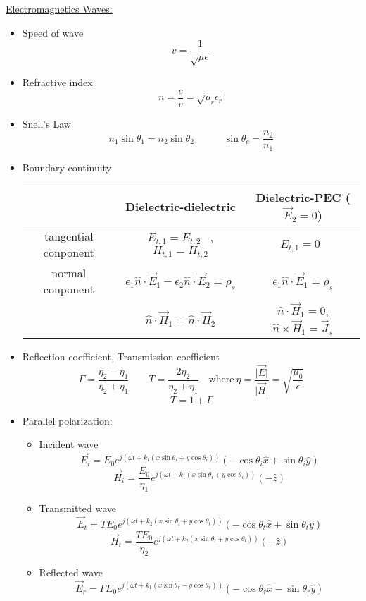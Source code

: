 \documentclass{article}
\begin{document}
\underline{Electromagnetics Waves:}
\begin{itemize}
	\item Speed of wave \[v=\frac{1}{\sqrt{\mu\epsilon}}\]
	\item Refractive index \[n=\frac{c}{v}=\sqrt{\mu_{r}\epsilon_{r}}\]
	\item Snell's Law \[n_{1}\sin\theta_{1} =n_{2}\sin\theta_{2} \quad \quad \quad \sin\theta_{c}=\frac{n_{2}}{n_{1}}\]
	\item Boundary continuity 
		\begin{table}[H] \centering
		\begin{tabular}{|c|c|c|}
		\hline
		& Dielectric-dielectric & Dielectric-PEC ($\vec{E}_{2}=0$)\\ \hline
		tangential conponent & $E_{t,1}=E_{t,2}$ \ ,  $H_{t,1}=H_{t,2}$ & $E_{t,1}=0$\  \\ \hline
		normal conponent & $\epsilon_{1}\hat{n}\cdot\vec{E}_{1}-\epsilon_{2}\hat{n}\cdot\vec{E}_{2}=\rho_{s}$  & $\epsilon_{1} \hat{n}\cdot\vec{E}_{1}=\rho_{s}$  \\ 
		& $\hat{n}\cdot\vec{H}_{1}=\hat{n}\cdot\vec{H}_{2}$ & $\hat{n}\cdot\vec{H}_{1}=0$, \quad  $\hat{n}\times \vec{H}_{1}=\vec{J}_{s}$ \\ \hline
		\end{tabular}
		\end{table}
	\item Reflection coefficient, Transmission coefficient \[\Gamma=\frac{\eta_{2}-\eta_{1}}{\eta_{2}+\eta_{1}} \quad \quad T=\frac{2\eta_{2}}{\eta_{2}+\eta_{1}} \quad \text{where} \ \eta=\frac{\lvert \vec{E} \rvert}{\lvert \vec{H} \rvert}=\sqrt{\frac{\mu_{0}}{\epsilon}}\] \[ T=1+\Gamma\]
	\item Parallel polarization:
	\begin{itemize}
		\item Incident wave \[ \vec{E}_{i}=E_{0}e^{j(\omega t+k_{1}(x\sin\theta_{i}+y\cos\theta_{i}))}(-\cos\theta_{i}\hat{x}+\sin\theta_{i}\hat{y}) \] 
			\[\vec{H}_{i}=\frac{E_{0}}{\eta_{1}}e^{j(\omega t+k_{1}(x\sin\theta_{i}+y\cos\theta_{i}))}(-\hat{z})\]
		\item Transmitted wave \[ \vec{E}_{t}=TE_{0}e^{j(\omega t+k_{2}(x\sin\theta_{t}+y\cos\theta_{t}))}(-\cos\theta_{t}\hat{x}+\sin\theta_{t}\hat{y}) \] 
			\[\vec{H}_{t}=\frac{TE_{0}}{\eta_{2}}e^{j(\omega t+k_{2}(x\sin\theta_{t}+y\cos\theta_{t}))}(-\hat{z})\]
		\item Reflected wave \[ \vec{E}_{r}=\Gamma E_{0}e^{j(\omega t+k_{1}(x\sin\theta_{r}-y\cos\theta_{r}))}(-\cos\theta_{r}\hat{x}-\sin\theta_{r}\hat{y}) \] 

\end{itemize}
\end{itemize}
\end{document}

